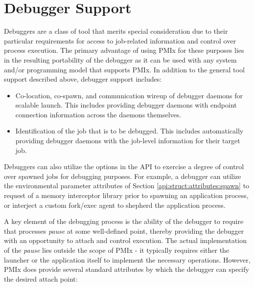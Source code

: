 \section{Debugger Support}
\label{chap:api_tools:debuggers}

Debuggers are a class of tool that merits special consideration due to their particular requirements for access to job-related information and control over process execution. The primary advantage of using \ac{PMIx} for these purposes lies in the resulting portability of the debugger as it can be used with any system and/or programming model that supports \ac{PMIx}. In addition to the general tool support described above, debugger support includes:

\begin{itemize}
    \item Co-location, co-spawn, and communication wireup of debugger daemons for scalable launch. This includes providing debugger daemons with endpoint connection information across the daemons themselves.
    \item Identification of the job that is to be debugged. This includes automatically providing debugger daemons with the job-level information for their target job.
\end{itemize}

Debuggers can also utilize the options in the  \ac{API} to exercise a degree of control over spawned jobs for debugging purposes. For example, a debugger can utilize the environmental parameter attributes of Section \ref{api:struct:attributes:spawn} to request  of a memory interceptor library prior to spawning an application process, or interject a custom fork/exec agent to shepherd the application process.

A key element of the debugging process is the ability of the debugger to require that processes \emph{pause} at some well-defined point, thereby providing the debugger with an opportunity to attach and control execution. The actual implementation of the \emph{pause} lies outside the scope of \ac{PMIx} - it typically requires either the launcher or the application itself to implement the necessary operations. However, \ac{PMIx} does provide several standard attributes by which the debugger can specify the desired attach point:


